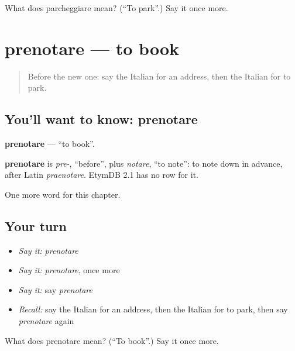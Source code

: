 \begin{tcolorbox}[breakable,colback=teal!4,colframe=teal!35!black,title={Before you move on}]
What does parcheggiare mean? (\textquotedblleft{}To park\textquotedblright{}.) Say it once more.
\end{tcolorbox}
\section[prenotare]{prenotare — to book}

\label{lesson:IT-C204-prenotare}



\begin{quote}
Before the new one: say the Italian for an address, then the Italian for to park.
\end{quote}

\subsection*{You'll want to know: prenotare}
\textbf{prenotare} — \textquotedblleft{}to book\textquotedblright{}.

\begin{cousinweb}
\textbf{prenotare} is \emph{pre-}, \textquotedblleft{}before\textquotedblright{}, plus \emph{notare}, \textquotedblleft{}to note\textquotedblright{}: to note down in advance, after Latin \emph{praenotare}. EtymDB 2.1 has no row for it.
\end{cousinweb}

\begin{grammarlens}[title={What you've built}]
One more word for this chapter.
\end{grammarlens}

\subsection*{Your turn}
\begin{itemize}
\raggedright
  \item \emph{Say it:} \emph{prenotare}
  \item \emph{Say it:} \emph{prenotare}, once more
  \item \emph{Say it:} say \emph{prenotare}
  \item \emph{Recall:} say the Italian for an address, then the Italian for to park, then say \emph{prenotare} again
\end{itemize}

\begin{tcolorbox}[breakable,colback=teal!4,colframe=teal!35!black,title={Before you move on}]
What does prenotare mean? (\textquotedblleft{}To book\textquotedblright{}.) Say it once more.
\end{tcolorbox}
